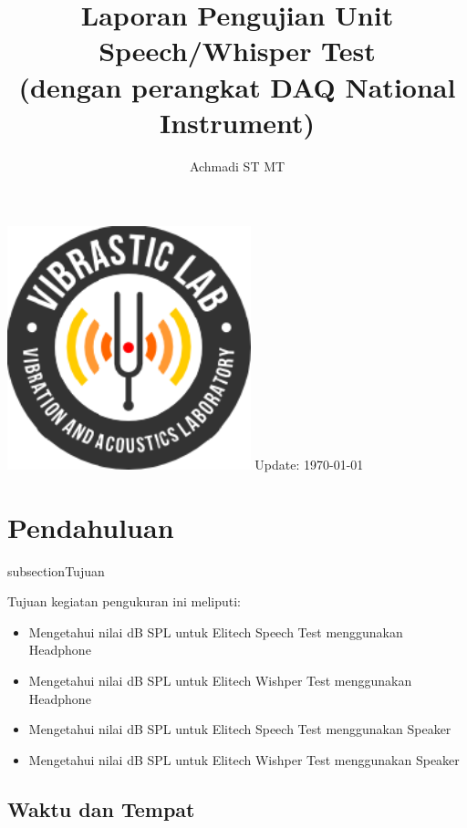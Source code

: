 \documentclass[12pt,]{article}
\title{\LARGE \bf
	Laporan Pengujian Unit Speech/Whisper Test\\
	(dengan perangkat DAQ National Instrument)
}
\author{Achmadi ST MT}
\date{}
\begin{document}
	\thispagestyle{empty}
	\pagestyle{empty}

	\begin{titlepage}
		\centering
		\vfill
		\vfill
		\maketitle
		\vfill
		\includegraphics[width=200pt]{images/logo/logoviblab}
		\vfill
		\vfill
		Update: {\today} \currenttime \\
	\end{titlepage}


	\newpage
	\tableofcontents


	\newpage
	\section{Pendahuluan}

	subsection{Tujuan}

	Tujuan kegiatan pengukuran ini meliputi:
	\begin{itemize}
		\item Mengetahui nilai dB SPL untuk Elitech Speech Test menggunakan Headphone
		\item Mengetahui nilai dB SPL untuk Elitech Wishper Test menggunakan Headphone
		\item Mengetahui nilai dB SPL untuk Elitech Speech Test menggunakan Speaker
		\item Mengetahui nilai dB SPL untuk Elitech Wishper Test menggunakan Speaker
	\end{itemize}

	\subsection{Waktu dan Tempat}
\end{document}
